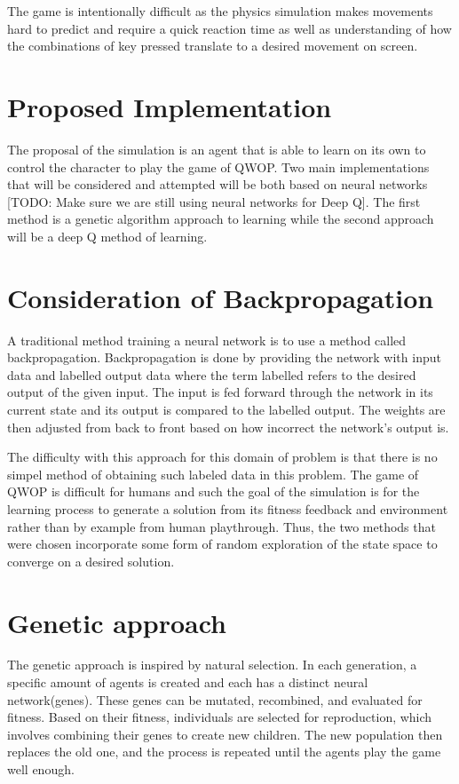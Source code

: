 \documentclass[letterpaper]{article} %
\begin{document}
\par The game is intentionally difficult as the physics simulation makes movements hard to predict and require a quick reaction time as well as understanding of how the combinations of key pressed translate to a desired movement on screen.

\section{Proposed Implementation}
The proposal of the simulation is an agent that is able to learn on its own to control the character to play the game of QWOP. Two main implementations that will be considered and attempted will be both based on neural networks [TODO: Make sure we are still using neural networks for Deep Q]. The first method is a genetic algorithm approach to learning while the second approach will be a deep Q method of learning.

\section{Consideration of Backpropagation}
A traditional method training a neural network is to use a method called backpropagation. Backpropagation is done by providing the network with input data and labelled output data where the term labelled refers to the desired output of the given input. The input is fed forward through the network in its current state and its output is compared to the labelled output. The weights are then adjusted from back to front based on how incorrect the network's output is. 

\par The difficulty with this approach for this domain of problem is that there is no simpel method of obtaining such labeled data in this problem. The game of QWOP is difficult for humans and such the goal of the simulation is for the learning process to generate a solution from its fitness feedback and environment rather than by example from human playthrough. Thus, the two methods that were chosen incorporate some form of random exploration of the state space to converge on a desired solution.

\section{Genetic approach}
The genetic approach is inspired by natural selection. In each generation, a specific amount of agents is created and each has a distinct neural network(genes). These genes can be mutated, recombined, and evaluated for fitness. Based on their fitness, individuals are selected for reproduction, which involves combining their genes to create new children. The new population then replaces the old one, and the process is repeated until the agents play the game well enough.
\end{document}
